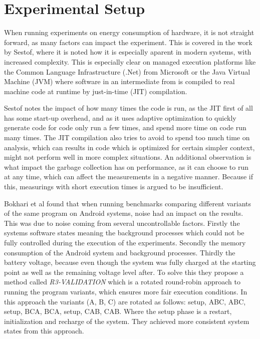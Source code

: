 
\section{Experimental Setup}

When running experiments on energy consumption of hardware, it is not straight forward, as many factors can impact the experiment. This is covered in the work by Sestof\cite*[]{sestoft2013microbenchmarks}, where it is noted how it is especially aparent in modern systems, with increased complexity. This is especially clear on managed execution platforms like the Common Language Infrastructure (.Net) from Microsoft or the Java Virtual Machine (JVM) where software in an intermediate from is compiled to real machine code at runtime by just-in-time (JIT) compilation.

Sestof\cite*[]{sestoft2013microbenchmarks} notes the impact of how many times the code is run, as the JIT first of all has some start-up overhead, and as it uses adaptive optimization to quickly generate code for code only run a few times, and spend more time on code run many times. The JIT compilation also tries to avoid to spend too much time on analysis, which can results in code which is optimized for certain simpler context, might not perform well in more complex situations. An additional observation is what impact the garbage collection has on performance, as it can choose to run at any time, which can affect the measurements in a negative manner. Because if this, measurings with short execution times is argued to be insufficient. 





Bokhari et al\cite{Bokhari2020r3} found that when running benchmarks comparing different variants of the same program on Android systems, noise had an impact on the results. This was due to noise coming from several uncontrollable factors. Firstly the systems software states meaning the background processes which could not be fully controlled during the execution of the experiments. Secondly the memory consumption of the Android system and background processes. Thirdly the battery voltage, because even though the system was fully charged at the starting point as well as the remaining voltage level after. To solve this they propose a method called \textit{R3-VALIDATION} which is a rotated round-robin approach to running the program variants, which ensures more fair execution conditions. In this approach the variants (A, B, C) are rotated as follows: setup, ABC, ABC, setup, BCA, BCA, setup, CAB, CAB. Where the setup phase is a restart, initialization and recharge of the system. They achieved more consistent system states from this approach.